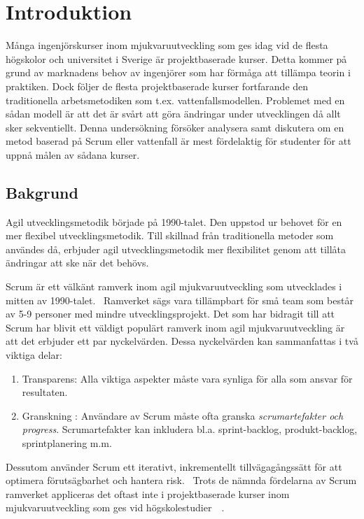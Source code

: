 \section{Introduktion}
\label{sec:Lieth_Wahid-introduction}
Många ingenjörskurser inom mjukvaruutveckling som ges idag vid de flesta högskolor och universitet i Sverige är projektbaserade kurser. Detta kommer på grund av marknadens behov av ingenjörer som har förmåga att tillämpa teorin i praktiken. Dock följer de flesta projektbaserade kurser fortfarande den traditionella arbetsmetodiken som t.ex. vattenfallsmodellen. Problemet med en sådan modell är att det är svårt att göra ändringar under utvecklingen då allt sker sekventiellt. Denna undersökning försöker analysera samt diskutera om en metod baserad på Scrum eller vattenfall är mest fördelaktig för studenter för att uppnå målen av sådana kurser.

\subsection{Bakgrund}
Agil utvecklingsmetodik började på 1990-talet. Den uppstod ur behovet för en mer flexibel utvecklingsmetodik. Till skillnad från traditionella metoder som användes då, erbjuder agil utvecklingsmetodik mer flexibilitet genom att tillåta ändringar att ske när det behövs.

Scrum är ett välkänt ramverk inom agil mjukvaruutveckling som utvecklades i mitten av 1990-talet.~\cite{TheScrum} 
Ramverket sägs vara tillämpbart för små team som består av 5-9 personer med mindre utvecklingsprojekt. Det som har bidragit till att Scrum har blivit ett väldigt populärt ramverk inom agil mjukvaruutveckling är att det erbjuder ett par nyckelvärden. Dessa nyckelvärden kan sammanfattas i två viktiga delar: 
\begin{enumerate}\label{two}
	\item Transparens: Alla viktiga aspekter måste vara synliga för alla som ansvar för resultaten.~\cite{TheScrum}
	\item Granskning : Användare av Scrum måste ofta granska \textit{scrumartefakter och progress}. Scrumartefakter kan inkludera
	bl.a. sprint-backlog, produkt-backlog, sprintplanering m.m.~\cite{TheScrum}
\end{enumerate} 
Dessutom använder Scrum ett iterativt, inkrementellt tillvägagångssätt för att optimera förutsägbarhet och hantera risk.~\cite{TheScrum} Trots de nämnda fördelarna av Scrum ramverket appliceras det oftast inte i projektbaserade kurser inom mjukvaruutveckling som ges vid högskolestudier~\cite{aamir2017incorporating}~\cite{GameDesign}. 

